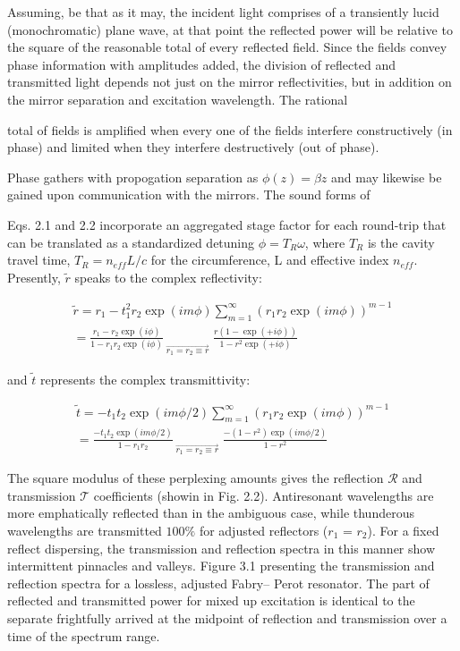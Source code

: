 Assuming, be that as it may, the incident light comprises of a transiently lucid (monochromatic) plane wave, at that point the reflected power will be relative to the square of the reasonable total of every reflected field. Since the fields convey phase information with amplitudes added, the division of reflected and transmitted light depends not just on the mirror reflectivities, but in addition on the mirror separation and excitation wavelength. The rational 

total of fields is amplified when every one of the fields interfere constructively (in phase) and limited when they interfere destructively (out of phase). 

Phase gathers with propogation separation as $\phi(z) = \beta z$ and may likewise be gained upon communication with the mirrors. The sound forms of 

Eqs. 2.1 and 2.2 incorporate an aggregated stage factor for each round-trip that can be translated as a standardized detuning $\phi = T_{R}\omega$, where $T_{R}$ is the cavity travel time, $T_{R} = n_{eff}L/c$ for the circumference, L and effective index $n_{eff}$. Presently, $\tilde{r}$ speaks to the complex reflectivity:

\begin{multline}
\tilde{r} = r_{1} - t_{1}^{2}r_{2}\exp{(i m \phi)} \sum_{m=1}^{\infty} (r_{1}r_{2}\exp{(i m \phi)})^{m-1} \\ = \frac{r_{1} - r_{2}\exp{(i \phi)}}{1 - r_{1}r_{2}\exp{(i \phi)}} _{\; \overrightarrow{r_{1} = r_{2} \equiv r}} \; \frac{r(1-\exp{(+i \phi)})}{1-r^{2}\exp{(+i \phi)}}
\end{multline}

and $\tilde{t}$ represents the complex transmittivity:

\begin{multline}
\tilde{t} = -t_{1}t_{2}\exp{(i m \phi/2)} \sum_{m=1}^{\infty} (r_{1}r_{2}\exp{(i m \phi)})^{m-1} \\ = \frac{-t_{1}t_{2}\exp{(i m \phi/2)}}{1 - r_{1}r_{2}} _{\; \overrightarrow{r_{1} = r_{2} \equiv r}} \; \frac{-(1-r^{2})\exp{(im \phi/2)}}{1-r^{2}}
\end{multline}


The square modulus of these perplexing amounts gives the reflection ${\mathcal R}$ and transmission ${\mathcal T}$ coefficients (showin in Fig. 2.2). Antiresonant wavelengths are more emphatically reflected than in the ambiguous case, while thunderous wavelengths are transmitted $100\%$ for adjusted reflectors ($r_{1}$ = $r_{2}$). For a fixed reflect dispersing, the transmission and reflection spectra in this manner show intermittent pinnacles and valleys. Figure 3.1 presenting the transmission and reflection spectra for a lossless, adjusted Fabry– Perot resonator. The part of reflected and transmitted power for mixed up excitation is identical to the separate frightfully arrived at the midpoint of reflection and transmission over a time of the spectrum range.

